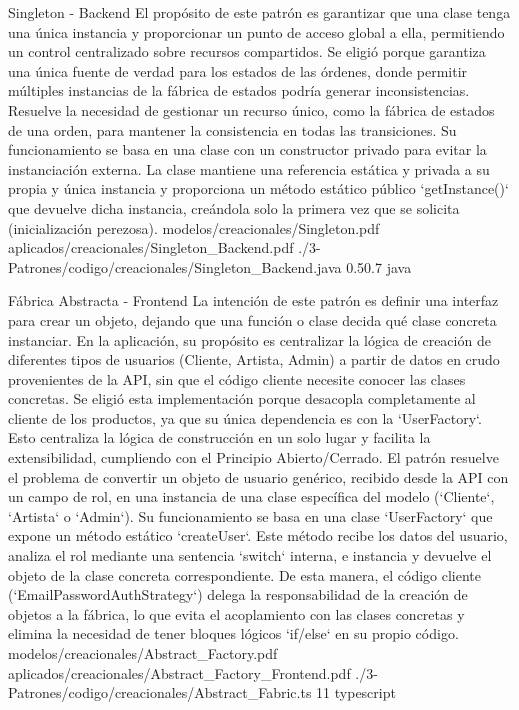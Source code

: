 \Patron
    {Singleton - Backend}
    {El propósito de este patrón es garantizar que una clase tenga una única instancia y proporcionar un punto de acceso global a ella, permitiendo un control centralizado sobre recursos compartidos. Se eligió porque garantiza una única fuente de verdad para los estados de las órdenes, donde permitir múltiples instancias de la fábrica de estados podría generar inconsistencias.}
    {Resuelve la necesidad de gestionar un recurso único, como la fábrica de estados de una orden, para mantener la consistencia en todas las transiciones. Su funcionamiento se basa en una clase con un constructor privado para evitar la instanciación externa. La clase mantiene una referencia estática y privada a su propia y única instancia y proporciona un método estático público `getInstance()` que devuelve dicha instancia, creándola solo la primera vez que se solicita (inicialización perezosa).}
    {modelos/creacionales/Singleton.pdf}
    {aplicados/creacionales/Singleton_Backend.pdf}
    {./3-Patrones/codigo/creacionales/Singleton_Backend.java}
    {0.5}{0.7}
    {java}
\newpage

\Patron
    {Fábrica Abstracta - Frontend}
    {La intención de este patrón es definir una interfaz para crear un objeto, dejando que una función o clase decida qué clase concreta instanciar. En la aplicación, su propósito es centralizar la lógica de creación de diferentes tipos de usuarios (Cliente, Artista, Admin) a partir de datos en crudo provenientes de la API, sin que el código cliente necesite conocer las clases concretas. Se eligió esta implementación porque desacopla completamente al cliente de los productos, ya que su única dependencia es con la `UserFactory`. Esto centraliza la lógica de construcción en un solo lugar y facilita la extensibilidad, cumpliendo con el Principio Abierto/Cerrado.}
    {El patrón resuelve el problema de convertir un objeto de usuario genérico, recibido desde la API con un campo de rol, en una instancia de una clase específica del modelo (`Cliente`, `Artista` o `Admin`). Su funcionamiento se basa en una clase `UserFactory` que expone un método estático `createUser`. Este método recibe los datos del usuario, analiza el rol mediante una sentencia `switch` interna, e instancia y devuelve el objeto de la clase concreta correspondiente. De esta manera, el código cliente (`EmailPasswordAuthStrategy`) delega la responsabilidad de la creación de objetos a la fábrica, lo que evita el acoplamiento con las clases concretas y elimina la necesidad de tener bloques lógicos `if/else` en su propio código.}
    {modelos/creacionales/Abstract_Factory.pdf}
    {aplicados/creacionales/Abstract_Factory_Frontend.pdf}
    {./3-Patrones/codigo/creacionales/Abstract_Fabric.ts}
    {1}{1}
    {typescript}
\newpage

